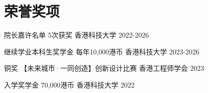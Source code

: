 \section{荣誉奖项}
\begin{cvhonors}

\cvhonor
{院长嘉许名单} %
{5次获奖} %
{香港科技大学} %
{2022-2026} %

\cvhonor
{继续学业本科生奖学金} %
{每年10,000港币} %
{香港科技大学} %
{2023-2026} %

\cvhonor
{铜奖} %
{【未来城市·一同创造】创新设计比赛} %
{香港工程师学会} %
{2023} %

\cvhonor
{入学奖学金} %
{70,000港币} %
{香港科技大学} %
{2022} %

\end{cvhonors}


